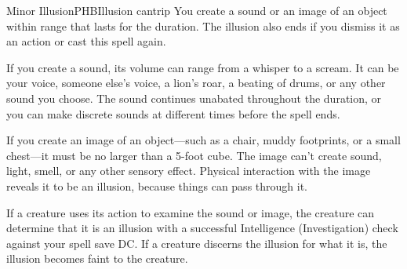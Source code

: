 \begin{spell}{Minor Illusion}{PHB}{Illusion cantrip}
{
}
You create a sound or an image of an object within range
that lasts for the duration. The illusion also ends if you
dismiss it as an action or cast this spell again.

If you create a sound, its volume can range from a whisper
to a scream. It can be your voice, someone else's voice, a
lion's roar, a beating of drums, or any other sound you
choose. The sound continues unabated throughout the
duration, or you can make discrete sounds at different
times before the spell ends.

If you create an image of an object—such as a chair, muddy
footprints, or a small chest—it must be no larger than a
5-foot cube. The image can't create sound, light, smell,
or any other sensory effect. Physical interaction with the
image reveals it to be an illusion, because things can pass
through it.

If a creature uses its action to examine the sound or image,
the creature can determine that it is an illusion with a
successful Intelligence (Investigation) check against your
spell save DC. If a creature discerns the illusion for what
it is, the illusion becomes faint to the creature.
\end{spell}
